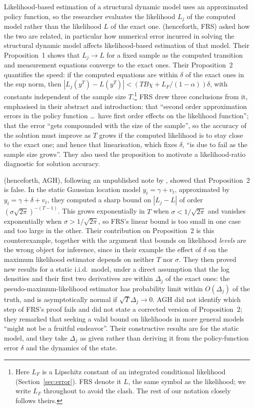 \documentclass[11pt]{article}
\theoremstyle{definition}
\theoremstyle{remark}
\begin{document}
Likelihood-based estimation of a structural dynamic model uses an approximated policy function, so the researcher evaluates the likelihood $L_j$ of the computed model rather than the likelihood $L$ of the exact one. \citet{FRS2006} (henceforth, FRS) asked how the two are related, in particular how numerical error incurred in solving the structural dynamic model affects likelihood-based estimation of that model. Their Proposition~1 shows that $L_j \to L$ for a fixed sample as the computed transition and measurement equations converge to the exact ones. Their Proposition~2 quantifies the speed: if the computed equations are within $\delta$ of the exact ones in the sup norm, then $|L_j(y^T) - L(y^T)| < (TB\chi + L_F/(1-\alpha)) \delta$, with constants independent of the sample size $T$.\footnote{Here $L_F$ is a Lipschitz constant of an integrated conditional likelihood (Section~\ref{sec:error}). FRS denote it $L$, the same symbol as the likelihood; we write $L_F$ throughout to avoid the clash. The rest of our notation closely follows theirs.} FRS drew three conclusions from it, emphasised in their abstract and introduction: that ``second order approximation errors in the policy function \ldots\ have first order effects on the likelihood function''; that the error ``gets compounded with the size of the sample'', so the accuracy of the solution must improve as $T$ grows if the computed likelihood is to stay close to the exact one; and hence that linearisation, which fixes $\delta$, ``is due to fail as the sample size grows''. They also used the proposition to motivate a likelihood-ratio diagnostic for solution accuracy.

\citet{AGH2009} (henceforth, AGH), following an unpublished note by \citet{Geweke2007}, showed that
Proposition~2 is false. In the static Gaussian location model $y_t = \gamma + v_t$, approximated
by $y_t = \gamma + \delta + v_t$, they computed a sharp bound on $|L_j - L|$ of order
$(\sigma\sqrt{2\pi})^{-(T-1)}$. This grows exponentially in $T$ when $\sigma < 1/\sqrt{2\pi}$ and
vanishes exponentially when $\sigma > 1/\sqrt{2\pi}$, so FRS's linear bound is too small in one
case and too large in the other. Their contribution on Proposition~2 is this counterexample,
together with the argument that bounds on likelihood \emph{levels} are the wrong object for
inference, since in their example the effect of $\delta$ on the maximum likelihood estimator
depends on neither $T$ nor $\sigma$. They then proved new results for a static i.i.d.\ model,
under a direct assumption that the log densities and their first two derivatives are within
$\Delta_j$ of the exact ones: the pseudo-maximum-likelihood estimator has probability limit within
$O(\Delta_j)$ of the truth, and is asymptotically normal if $\sqrt{T}\Delta_j \to 0$. AGH did not
identify which step of FRS's proof fails and did not state a corrected version of Proposition~2;
they remarked that seeking a valid bound on likelihoods in more general models ``might not be a
fruitful endeavor''. Their constructive results are for the static model, and they take
$\Delta_j$ as given rather than deriving it from the policy-function error $\delta$ and the
dynamics of the state.
\end{document}
